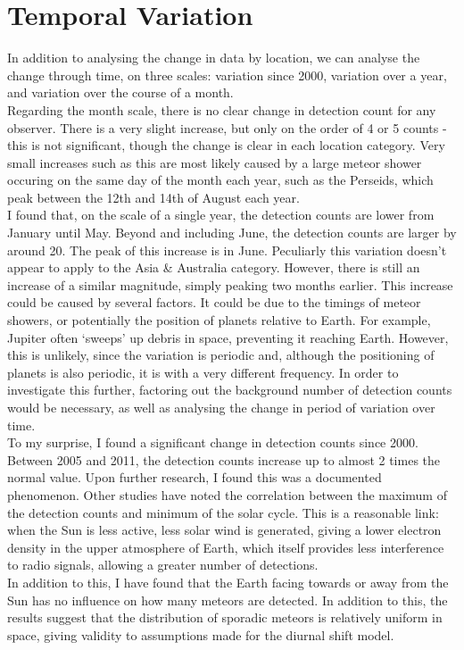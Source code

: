 \documentclass[12pt]{article}
\begin{document}
\section{Temporal Variation}

\large{
In addition to analysing the change in data by location, we can analyse the
change through time, on three scales: variation since 2000, variation over a
year, and variation over the course of a month.\\ 

Regarding the month scale, there is no clear change in detection count for any
observer. There is a very slight increase, but only on the order of 4 or 5
counts - this is not significant, though the change is clear in each location
category. Very small increases such as this are most likely caused by a large
meteor shower occuring on the same day of the month each year, such as the
Perseids, which peak between the 12th and 14th of August each year.\\

I found that, on the scale of a single year, the detection counts are lower
from January until May. Beyond and including June, the detection counts are
larger by around 20. The peak of this increase is in June. Peculiarly this
variation doesn't appear to apply to the Asia \& Australia category. However,
there is still an increase of a similar magnitude, simply peaking two months
earlier.  This increase could be caused by several factors. It could be due to
the timings of meteor showers, or potentially the position of planets relative
to Earth. For example, Jupiter often `sweeps' up debris in space, preventing it
reaching Earth. However, this is unlikely, since the variation is periodic and,
although the positioning of planets is also periodic, it is with a very
different frequency. In order to investigate this further, factoring out the
background number of detection counts would be necessary, as well as analysing
the change in period of variation over time.\\

To my surprise, I found a significant change in detection counts since 2000.
Between 2005 and 2011, the detection counts increase up to almost 2 times the
normal value. Upon further research, I found this was a documented phenomenon.
Other studies have noted the correlation between the maximum of the detection
counts and minimum of the solar cycle. This is a reasonable link: when the Sun
is less active, less solar wind is generated, giving a lower electron density
in the upper atmosphere of Earth, which itself provides less interference to
radio signals, allowing a greater number of detections.\\

In addition to this, I have found that the Earth facing towards or away from
the Sun has no influence on how many meteors are detected. In addition to this,
the results suggest that the distribution of sporadic meteors is relatively
uniform in space, giving validity to assumptions made for the diurnal shift
model.\\
}
\end{document}
